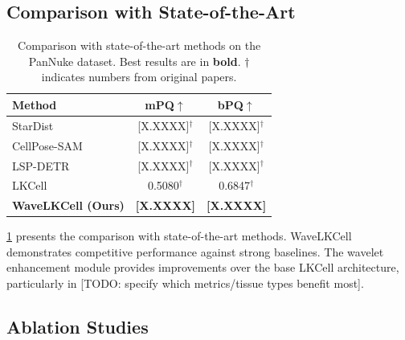 \documentclass[conference]{IEEEtran}
\begin{document}
\subsection{Comparison with State-of-the-Art}

\begin{table}[t]
\centering
\caption{Comparison with state-of-the-art methods on the PanNuke dataset. Best results are in \textbf{bold}. $\dagger$ indicates numbers from original papers.}
\label{tab:comparison}
\begin{tabular}{lcc}
\toprule
\textbf{Method} & \textbf{mPQ}$\uparrow$ & \textbf{bPQ}$\uparrow$ \\
\midrule
StarDist~\cite{stardist} & [X.XXXX]$^\dagger$ & [X.XXXX]$^\dagger$ \\
CellPose-SAM~\cite{cellpose} & [X.XXXX]$^\dagger$ & [X.XXXX]$^\dagger$ \\
LSP-DETR~\cite{lsp_detr} & [X.XXXX]$^\dagger$ & [X.XXXX]$^\dagger$ \\
LKCell~\cite{lkcell} & 0.5080$^\dagger$ & 0.6847$^\dagger$ \\
\midrule
\textbf{WaveLKCell (Ours)} & \textbf{[X.XXXX]} & \textbf{[X.XXXX]} \\
\bottomrule
\end{tabular}
\end{table}

\cref{tab:comparison} presents the comparison with state-of-the-art methods. WaveLKCell demonstrates competitive performance against strong baselines. The wavelet enhancement module provides improvements over the base LKCell architecture, particularly in [TODO: specify which metrics/tissue types benefit most].


\subsection{Ablation Studies}
\end{document}
